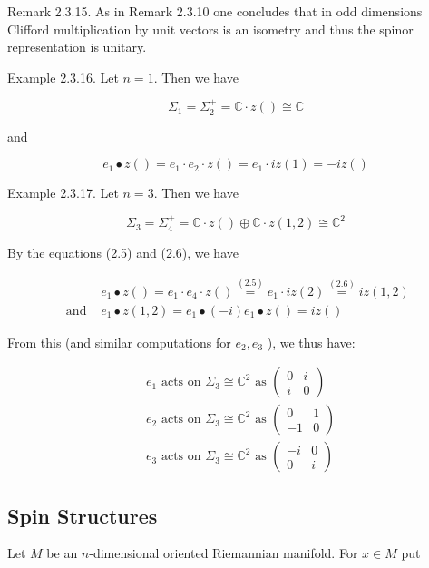 \documentclass[10pt, letterpaper]{article}
\begin{document}
Remark 2.3.15. As in Remark 2.3.10 one concludes that in odd dimensions Clifford multiplication by unit vectors is an isometry and thus the spinor representation is unitary.

Example 2.3.16. Let $n=1$. Then we have

$$
\Sigma_{1}=\Sigma_{2}^{+}=\mathbb{C} \cdot z() \cong \mathbb{C}
$$

and

$$
e_{1} \bullet z()=e_{1} \cdot e_{2} \cdot z()=e_{1} \cdot i z(1)=-i z()
$$

Example 2.3.17. Let $n=3$. Then we have

$$
\Sigma_{3}=\Sigma_{4}^{+}=\mathbb{C} \cdot z() \oplus \mathbb{C} \cdot z(1,2) \cong \mathbb{C}^{2}
$$

By the equations (2.5) and (2.6), we have

$$
\begin{array}{ll} 
& e_{1} \bullet z()=e_{1} \cdot e_{4} \cdot z() \stackrel{(2.5)}{=} e_{1} \cdot i z(2) \stackrel{(2.6)}{=} i z(1,2) \\
\text { and } & e_{1} \bullet z(1,2)=e_{1} \bullet(-i) e_{1} \bullet z()=i z()
\end{array}
$$

From this (and similar computations for $e_{2}, e_{3}$ ), we thus have:

$$
\begin{aligned}
& e_{1} \text { acts on } \Sigma_{3} \cong \mathbb{C}^{2} \text { as }\left(\begin{array}{cc}
0 & i \\
i & 0
\end{array}\right) \\
& e_{2} \text { acts on } \Sigma_{3} \cong \mathbb{C}^{2} \text { as }\left(\begin{array}{cc}
0 & 1 \\
-1 & 0
\end{array}\right) \\
& e_{3} \text { acts on } \Sigma_{3} \cong \mathbb{C}^{2} \text { as }\left(\begin{array}{cc}
-i & 0 \\
0 & i
\end{array}\right)
\end{aligned}
$$


\pagebreak


\subsection{Spin Structures}
Let $M$ be an $n$-dimensional oriented Riemannian manifold. For $x \in M$ put
\end{document}
